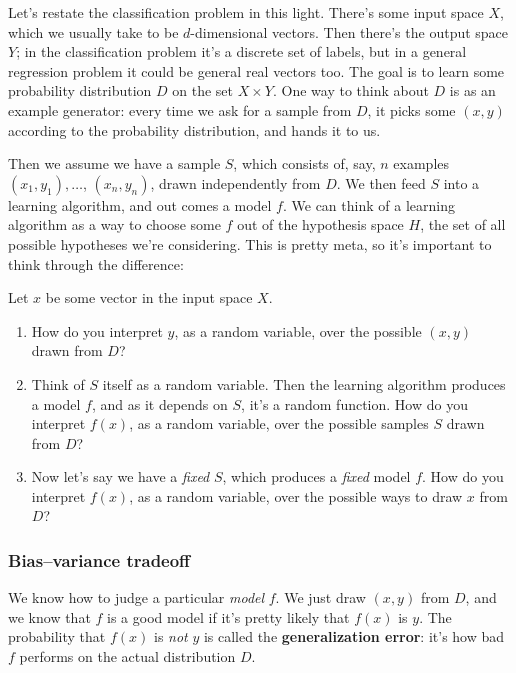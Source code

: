 \documentclass[11pt,paper=letter]{scrartcl}
\begin{document}
Let's restate the classification problem in this light. There's some input space $X$, which we usually take to be $d$-dimensional vectors. Then there's the output space $Y$; in the classification problem it's a discrete set of labels, but in a general regression problem it could be general real vectors too. The goal is to learn some probability distribution $D$ on the set $X \times Y$. One way to think about $D$ is as an example generator: every time we ask for a sample from $D$, it picks some $(x, y)$ according to the probability distribution, and hands it to us.

Then we assume we have a sample $S$, which consists of, say, $n$ examples $(x_1, y_1), \ldots$, $(x_n, y_n)$, drawn independently from $D$. We then feed $S$ into a learning algorithm, and out comes a model $f$. We can think of a learning algorithm as a way to choose some $f$ out of the hypothesis space $H$, the set of all possible hypotheses we're considering. This is pretty meta, so it's important to think through the difference:

\begin{exrboxed}
  Let $x$ be some vector in the input space $X$.
  \begin{enumerate}
    \item How do you interpret $y$, as a random variable, over the possible $(x, y)$ drawn from $D$?
    \item Think of $S$ itself as a random variable. Then the learning algorithm produces a model $f$, and as it depends on $S$, it's a random function. How do you interpret $f(x)$, as a random variable, over the possible samples $S$ drawn from $D$?
    \item Now let's say we have a \textit{fixed} $S$, which produces a \textit{fixed} model $f$. How do you interpret $f(x)$, as a random variable, over the possible ways to draw $x$ from $D$?
  \end{enumerate}
\end{exrboxed}

\subsubsection*{Bias--variance tradeoff}

We know how to judge a particular \textit{model} $f$. We just draw $(x, y)$ from $D$, and we know that $f$ is a good model if it's pretty likely that $f(x)$ is $y$. The probability that $f(x)$ is \textit{not} $y$ is called the \textbf{generalization error}: it's how bad $f$ performs on the actual distribution $D$.
\end{document}
